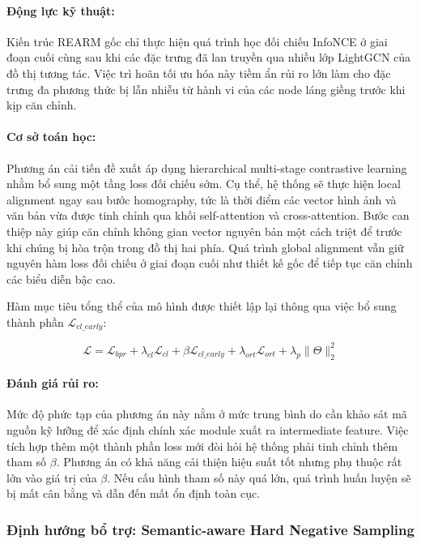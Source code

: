 \begin{longtable}
\paragraph{Động lực kỹ thuật:}
Kiến trúc REARM gốc chỉ thực hiện quá trình học đối chiếu InfoNCE ở giai đoạn cuối cùng sau khi các đặc trưng đã lan truyền qua nhiều lớp LightGCN của đồ thị tương tác. Việc trì hoãn tối ưu hóa này tiềm ẩn rủi ro lớn làm cho đặc trưng đa phương thức bị lẫn nhiễu từ hành vi của các node láng giềng trước khi kịp căn chỉnh.

\paragraph{Cơ sở toán học:}
Phương án cải tiến đề xuất áp dụng hierarchical multi-stage contrastive learning nhằm bổ sung một tầng loss đối chiếu sớm. Cụ thể, hệ thống sẽ thực hiện local alignment ngay sau bước homography, tức là thời điểm các vector hình ảnh và văn bản vừa được tinh chỉnh qua khối self-attention và cross-attention. Bước can thiệp này giúp căn chỉnh không gian vector nguyên bản một cách triệt để trước khi chúng bị hòa trộn trong đồ thị hai phía. Quá trình global alignment vẫn giữ nguyên hàm loss đối chiếu ở giai đoạn cuối như thiết kế gốc để tiếp tục căn chỉnh các biểu diễn bậc cao.

Hàm mục tiêu tổng thể của mô hình được thiết lập lại thông qua việc bổ sung thành phần $\mathcal{L}_{cl\_early}$:

\begin{equation}
\mathcal{L} = \mathcal{L}_{bpr} + \lambda_{cl} \mathcal{L}_{cl} + \beta \mathcal{L}_{cl\_early} + \lambda_{ort} \mathcal{L}_{ort} + \lambda_p \|\Theta\|_2^2
\end{equation}

\paragraph{Đánh giá rủi ro:}
Mức độ phức tạp của phương án này nằm ở mức trung bình do cần khảo sát mã nguồn kỹ lưỡng để xác định chính xác module xuất ra intermediate feature. Việc tích hợp thêm một thành phần loss mới đòi hỏi hệ thống phải tinh chỉnh thêm tham số $\beta$. Phương án có khả năng cải thiện hiệu suất tốt nhưng phụ thuộc rất lớn vào giá trị của $\beta$. Nếu cấu hình tham số này quá lớn, quá trình huấn luyện sẽ bị mất cân bằng và dẫn đến mất ổn định toàn cục.

\subsubsection{Định hướng bổ trợ: Semantic-aware Hard Negative Sampling}


\end{longtable}
